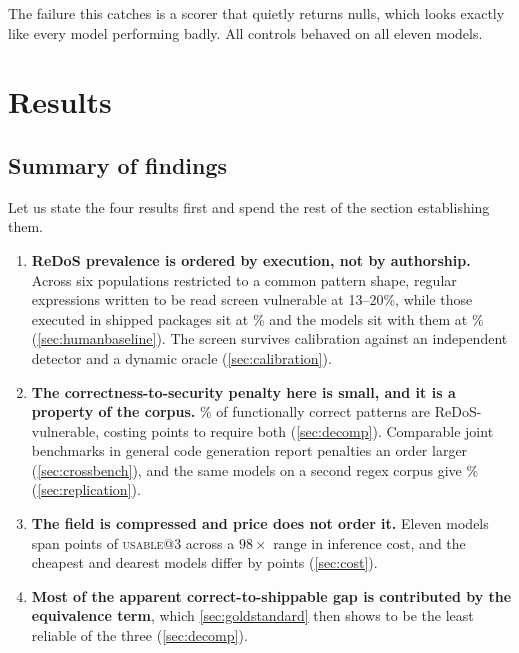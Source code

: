 \documentclass[11pt]{article}
\newcommand{\usable}{\textsc{usable}}
\begin{document}
The failure this catches is a scorer that quietly returns nulls, which looks
exactly like every model performing badly. All controls behaved on all eleven
models.

\section{Results}
\label{sec:results}

\subsection{Summary of findings}

Let us state the four results first and spend the rest of the section
establishing them.

\begin{enumerate}
  \item \textbf{ReDoS prevalence is ordered by execution, not by
  authorship.} Across six populations restricted to a common pattern shape,
  regular expressions written to be read screen vulnerable at 13--20\%, while
  those executed in shipped packages sit at \anchoredprod{}\% and the models
  sit with them at \anchoredmodels{}\% (\cref{sec:humanbaseline}). The screen
  survives calibration against an independent detector and a dynamic oracle
  (\cref{sec:calibration}).

  \item \textbf{The correctness-to-security penalty here is small, and it is
  a property of the corpus.} \vulngivencorrect{}\% of functionally correct
  patterns are ReDoS-vulnerable, costing \safetyloss{} points to require both
  (\cref{sec:decomp}). Comparable joint benchmarks in general code generation
  report penalties an order larger (\cref{sec:crossbench}), and the same
  models on a second regex corpus give \srvulngivencorrect{}\%
  (\cref{sec:replication}).

  \item \textbf{The field is compressed and price does not order it.} Eleven
  models span \bandwidth{} points of \usable{}@3 across a $98\times$ range in
  inference cost, and the cheapest and dearest models differ by
  \costgap{} points (\cref{sec:cost}).

  \item \textbf{Most of the apparent correct-to-shippable gap is contributed
  by the equivalence term}, which \cref{sec:goldstandard} then shows to be
  the least reliable of the three (\cref{sec:decomp}).
\end{enumerate}
\end{document}

